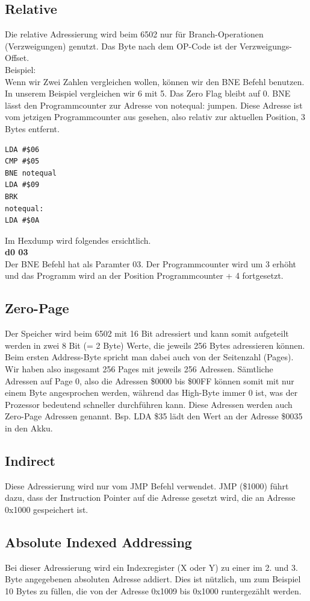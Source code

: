 \documentclass[a4paper,10pt]{report}
\begin{document}
\subsection{Relative}
Die relative Adressierung wird beim 6502 nur für Branch-Operationen (Verzweigungen) genutzt. Das Byte nach dem OP-Code ist der Verzweigungs-Offset.\\\noindent
Beispiel:\\
Wenn wir Zwei Zahlen vergleichen wollen, können wir den BNE Befehl benutzen. In unserem Beispiel vergleichen wir 6 mit 5. Das Zero Flag bleibt auf 0. BNE lässt den Programmcounter zur Adresse von notequal: jumpen. Diese Adresse ist vom jetzigen Programmcounter aus gesehen, also relativ zur aktuellen Position,  3 Bytes entfernt.\\
\begin{lstlisting}[]
LDA #$06
CMP #$05
BNE notequal
LDA #$09
BRK
notequal:
LDA #$0A
\end{lstlisting}
Im Hexdump wird folgendes ersichtlich.\\
\textbf{d0 03}\\
Der BNE Befehl hat als Paramter 03. Der Programmcounter wird um 3 erhöht und das Programm wird an der Position Programmcounter + 4 fortgesetzt.
\subsection{Zero-Page}
Der Speicher wird beim 6502 mit 16 Bit adressiert und kann somit aufgeteilt werden in zwei 8 Bit (= 2 Byte) Werte, die jeweils 256 Bytes adressieren können. Beim ersten Address-Byte spricht man dabei auch von der Seitenzahl (Pages). Wir haben also insgesamt 256 Pages mit jeweils 256 Adressen. Sämtliche Adressen auf Page 0, also die Adressen \$0000 bis \$00FF können somit mit nur einem Byte angesprochen werden, während das High-Byte immer 0 ist, was der Prozessor bedeutend schneller durchführen kann. Diese Adressen werden auch Zero-Page Adressen genannt. Bsp. LDA \$35 lädt den Wert an der Adresse \$0035 in den Akku. 
\subsection{Indirect}
Diese Adressierung wird nur vom JMP Befehl verwendet. JMP (\$1000) führt dazu, dass der Instruction Pointer auf die Adresse gesetzt wird, die an Adresse 0x1000 gespeichert ist.
\subsection{Absolute Indexed Addressing}
Bei dieser Adressierung wird ein Indexregister (X oder Y) zu einer im 2. und 3. Byte angegebenen absoluten Adresse addiert. Dies ist nützlich, um zum Beispiel 10 Bytes zu füllen, die von der Adresse 0x1009 bis 0x1000 runtergezählt werden.
\end{document}
